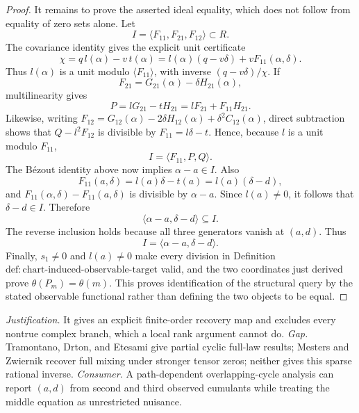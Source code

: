 \documentclass{article}
\begin{document}
\begin{proof}
It remains to prove the asserted ideal equality, which does not follow from equality of zero sets alone. Let
\[
I=\langle F_{11},F_{21},F_{12}\rangle\subset R.
\]
The covariance identity gives the explicit unit certificate
\[
\chi=q\,l(\alpha)-v\,t(\alpha)
=l(\alpha)(q-v\delta)+vF_{11}(\alpha,\delta).
\]
Thus \(l(\alpha)\) is a unit modulo \(\langle F_{11}\rangle\), with inverse \((q-v\delta)/\chi\). If
\[
F_{21}=G_{21}(\alpha)-\delta H_{21}(\alpha),
\]
multilinearity gives
\[
P=lG_{21}-tH_{21}=lF_{21}+F_{11}H_{21}.
\]
Likewise, writing \(F_{12}=G_{12}(\alpha)-2\delta H_{12}(\alpha)+\delta^2C_{12}(\alpha)\), direct subtraction shows that \(Q-l^2F_{12}\) is divisible by \(F_{11}=l\delta-t\). Hence, because \(l\) is a unit modulo \(F_{11}\),
\[
I=\langle F_{11},P,Q\rangle.
\]
The Bézout identity above now implies \(\alpha-a\in I\). Also
\[
F_{11}(a,\delta)=l(a)\delta-t(a)=l(a)(\delta-d),
\]
and \(F_{11}(\alpha,\delta)-F_{11}(a,\delta)\) is divisible by \(\alpha-a\). Since \(l(a)\neq0\), it follows that \(\delta-d\in I\). Therefore
\[
\langle\alpha-a,\delta-d\rangle\subseteq I.
\]
The reverse inclusion holds because all three generators vanish at \((a,d)\). Thus
\[
I=\langle\alpha-a,\delta-d\rangle.
\]
Finally, \(s_1\neq0\) and \(l(a)\neq0\) make every division in Definition \(\mathrm{def:chart\mbox{-}induced\mbox{-}observable\mbox{-}target}\) valid, and the two coordinates just derived prove \(\theta(P_m)=\theta(m)\). This proves identification of the structural query by the stated observable functional rather than defining the two objects to be equal.
\end{proof}
\par\smallskip\noindent \textit{Justification.} It gives an explicit finite-order recovery map and excludes every nontrue complex branch, which a local rank argument cannot do. \textit{Gap.} Tramontano, Drton, and Etesami give partial cyclic full-law results; Mesters and Zwiernik recover full mixing under stronger tensor zeros; neither gives this sparse rational inverse. \textit{Consumer.} A path-dependent overlapping-cycle analysis can report \((a,d)\) from second and third observed cumulants while treating the middle equation as unrestricted nuisance.
\end{document}
